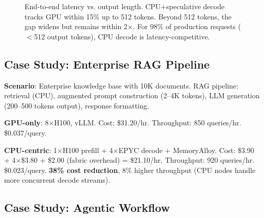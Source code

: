 \documentclass[conference,10pt]{IEEEtran}
\begin{document}
\begin{figure}[!htbp]
\centering
{}
\caption{End-to-end latency vs. output length. CPU+speculative decode tracks GPU within 15\% up to 512 tokens. Beyond 512 tokens, the gap widens but remains within 2$\times$. For 98\% of production requests ($<$512 output tokens), CPU decode is latency-competitive.}
\label{fig:latency}
\end{figure}

\subsection{Case Study: Enterprise RAG Pipeline}

\textbf{Scenario}: Enterprise knowledge base with 10K documents. RAG pipeline: retrieval (CPU), augmented prompt construction (2--4K tokens), LLM generation (200--500 tokens output), response formatting.

\textbf{GPU-only}: 8$\times$H100, vLLM. Cost: \$31.20/hr. Throughput: 850 queries/hr. \$0.037/query.

\textbf{CPU-centric}: 1$\times$H100 prefill + 4$\times$EPYC decode + MemoryAlloy. Cost: \$3.90 + 4$\times$\$3.80 + \$2.00 (fabric overhead) = \$21.10/hr. Throughput: 920 queries/hr. \$0.023/query. \textbf{38\% cost reduction}, 8\% higher throughput (CPU nodes handle more concurrent decode streams).

\subsection{Case Study: Agentic Workflow}
\end{document}
